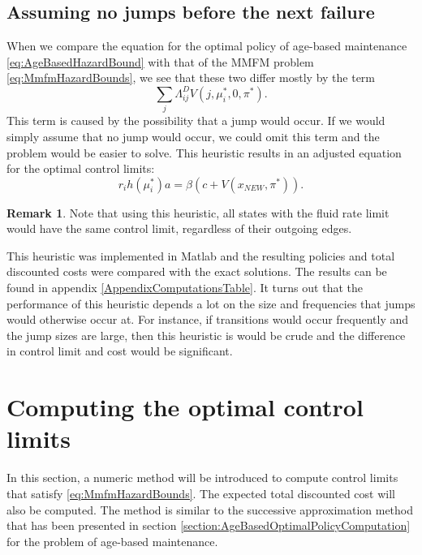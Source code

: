 \documentclass[a4paper]{thesis}
\theoremstyle{definition}
\newtheorem{remark}{Remark}[chapter]
\begin{document}
\subsection{Assuming no jumps before the next failure}
When we compare the equation for the optimal policy of age-based maintenance \eqref{eq:AgeBasedHazardBound} with that of the MMFM problem \eqref{eq:MmfmHazardBounds},
we see that these two differ mostly by the term 
\[
\sum\limits_j\Lambda^D_{ij}V(j,\mu_i^*,0,\pi^*).
\]
This term is caused by the possibility that a jump would occur.
If we would simply assume that no jump would occur, we could omit this term and the problem would be easier to solve.
This heuristic results in an adjusted equation for the optimal control limits:
\[
r_ih(\mu_i^*)a=\beta(c+V(x_{NEW},\pi^*)).
\]
\begin{remark}
	Note that using this heuristic, all states with the fluid rate limit would have the same control limit, regardless of their outgoing edges.
\end{remark}
This heuristic was implemented in Matlab and the resulting policies and total discounted costs were compared with the exact solutions.
The results can be found in appendix \ref{AppendixComputationsTable}.
It turns out that the performance of this heuristic depends a lot on the size and frequencies that jumps would otherwise occur at.
For instance, if transitions would occur frequently and the jump sizes are large, then this heuristic is would be crude and the difference in control limit and cost would be significant. \section{Computing the optimal control limits}
In this section, a numeric method will be introduced to compute control limits that satisfy \eqref{eq:MmfmHazardBounds}.
The expected total discounted cost will also be computed.
The method is similar to the successive approximation method that has been presented in section \ref{section:AgeBasedOptimalPolicyComputation} for the problem of age-based maintenance.
\end{document}
